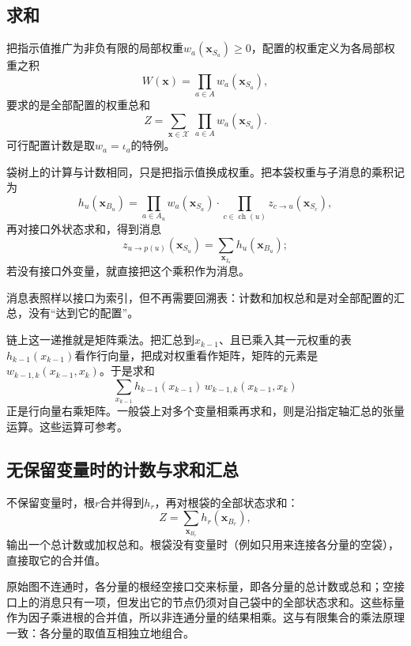 \subsection{求和}
\label{sec:graph-dp-weighted-sum}

把指示值推广为非负有限的局部权重$w_a(\bm x_{S_a})\geq0$，配置的权重定义为各局部权重之积
\[
W(\bm x)=\prod_{a\in A}w_a(\bm x_{S_a}),
\]
要求的是全部配置的权重总和
\begin{equation}
Z=\sum_{\bm x\in\mathcal X}\ \prod_{a\in A}w_a(\bm x_{S_a}).
\label{eq:graph-dp-weighted-sum}
\end{equation}
可行配置计数是取$w_a=\iota_a$的特例。

袋树上的计算与计数相同，只是把指示值换成权重。把本袋权重与子消息的乘积记为
\[
h_u(\bm x_{B_u})=\prod_{a\in A_u}w_a(\bm x_{S_a})\cdot\prod_{c\in\operatorname{ch}(u)}z_{c\to u}(\bm x_{S_c}),
\]
再对接口外状态求和，得到消息
\begin{equation}
z_{u\to p(u)}(\bm x_{S_u})=\sum_{\bm x_{I_u}}h_u(\bm x_{B_u});
\label{eq:graph-dp-sum-message}
\end{equation}
若没有接口外变量，就直接把这个乘积作为消息。

消息表照样以接口为索引，但不再需要回溯表：计数和加权总和是对全部配置的汇总，没有“达到它的配置”。

链上这一递推就是矩阵乘法。把汇总到$x_{k-1}$、且已乘入其一元权重的表$h_{k-1}(x_{k-1})$看作行向量，把成对权重看作矩阵，矩阵的元素是$w_{k-1,k}(x_{k-1},x_k)$。于是求和
\[
\sum_{x_{k-1}}h_{k-1}(x_{k-1})\,w_{k-1,k}(x_{k-1},x_k)
\]
正是行向量右乘矩阵。一般袋上对多个变量相乘再求和，则是沿指定轴汇总的张量运算。这些运算可参考。

\subsection{无保留变量时的计数与求和汇总}
\label{sec:graph-dp-total-aggregation}

不保留变量时，根$r$合并得到$h_r$，再对根袋的全部状态求和：
\begin{equation}
Z=\sum_{\bm x_{B_r}}h_r(\bm x_{B_r}),
\label{eq:graph-dp-root-sum}
\end{equation}
输出一个总计数或加权总和。根袋没有变量时（例如只用来连接各分量的空袋），直接取它的合并值。

原始图不连通时，各分量的根经空接口交来标量，即各分量的总计数或总和；空接口上的消息只有一项，但发出它的节点仍须对自己袋中的全部状态求和。这些标量作为因子乘进根的合并值，所以非连通分量的结果相乘。这与有限集合的乘法原理一致：各分量的取值互相独立地组合。

